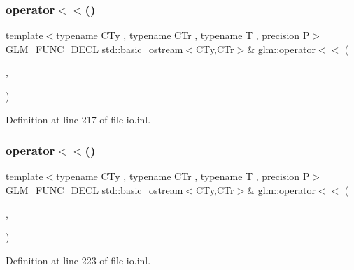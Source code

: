 \subsubsection{\texorpdfstring{operator$<$$<$()}{operator<<()}\hspace{0.1cm}{\footnotesize\ttfamily [4/15]}}
{\footnotesize\ttfamily template$<$typename C\+Ty , typename C\+Tr , typename T , precision P$>$ \\
\mbox{\hyperlink{setup_8hpp_ab2d052de21a70539923e9bcbf6e83a51}{G\+L\+M\+\_\+\+F\+U\+N\+C\+\_\+\+D\+E\+CL}} std\+::basic\+\_\+ostream$<$C\+Ty,C\+Tr$>$\& glm\+::operator$<$$<$ (\begin{DoxyParamCaption}\item[{std\+::basic\+\_\+ostream$<$ C\+Ty, C\+Tr $>$ \&}]{,  }\item[{\mbox{\hyperlink{structglm_1_1tvec3}{tvec3}}$<$ T, P $>$ const \&}]{ }\end{DoxyParamCaption})}



Definition at line 217 of file io.\+inl.

\mbox{\label{group__gtx__io_ga948ab426a879f24236d8978ee9b5fade}} 
\subsubsection{\texorpdfstring{operator$<$$<$()}{operator<<()}\hspace{0.1cm}{\footnotesize\ttfamily [5/15]}}
{\footnotesize\ttfamily template$<$typename C\+Ty , typename C\+Tr , typename T , precision P$>$ \\
\mbox{\hyperlink{setup_8hpp_ab2d052de21a70539923e9bcbf6e83a51}{G\+L\+M\+\_\+\+F\+U\+N\+C\+\_\+\+D\+E\+CL}} std\+::basic\+\_\+ostream$<$C\+Ty,C\+Tr$>$\& glm\+::operator$<$$<$ (\begin{DoxyParamCaption}\item[{std\+::basic\+\_\+ostream$<$ C\+Ty, C\+Tr $>$ \&}]{,  }\item[{\mbox{\hyperlink{structglm_1_1tvec4}{tvec4}}$<$ T, P $>$ const \&}]{ }\end{DoxyParamCaption})}



Definition at line 223 of file io.\+inl.

\mbox{\label{group__gtx__io_ga61fbdb6ad70c4c8d750a847251fa4a4a}} 
